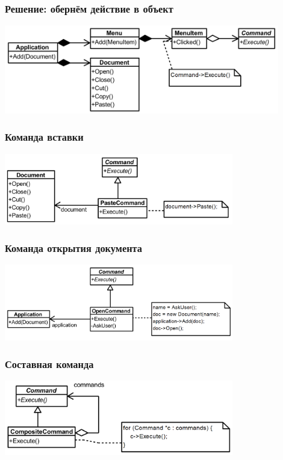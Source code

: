 \documentclass{../../slides-style}
\begin{document}
    \begin{frame}
        \frametitle{Решение: обернём действие в объект}
        \begin{center}
            \includegraphics[width=0.9\textwidth]{commandExample.png}
        \end{center}
    \end{frame}

    \begin{frame}
        \frametitle{Команда вставки}
        \begin{center}
            \includegraphics[width=0.75\textwidth]{pasteCommand.png}
        \end{center}
    \end{frame}

    \begin{frame}
        \frametitle{Команда открытия документа}
        \begin{center}
            \includegraphics[width=0.75\textwidth]{openDocumentCommand.png}
        \end{center}
    \end{frame}

    \begin{frame}
        \frametitle{Составная команда}
        \begin{center}
            \includegraphics[width=0.75\textwidth]{compositeCommand.png}
        \end{center}
    \end{frame}
\end{document}
